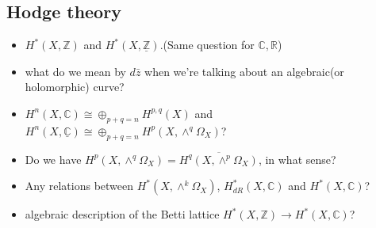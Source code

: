 \documentclass[main.tex]{subfiles}
\begin{document}
\subsection{Hodge theory}
\begin{remark}
\begin{itemize}
We want to clarify the following concepts
\item $H^{*}(X,\mathbb{Z})$ and $H^{*}(X, \underline{\mathbb{Z}})$.(Same question for $\mathbb{C}, \mathbb{R}$)
\item what do we mean by $d\bar{z}$ when we're talking about an algebraic(or holomorphic) curve?
\item $H^{n}(X,\mathbb{C})\cong \oplus_{p+q=n} H^{p,q}(X)$ and $H^{n}(X,\underline{\mathbb{C}})\cong \oplus_{p+q=n} H^{p}(X, \wedge^{q}\Omega_{X})$? 
\item Do we have $H^{p}(X, \wedge^{q}\Omega_{X})=\overline{H^{q}(X, \wedge^{p}\Omega_{X})}$, in what sense?
\item Any relations between $H^{*}(X, \wedge^{k}\Omega_{X})$, $H_{dR}^{*}(X, \mathbb{C})$ and $H^{*}(X,\mathbb{C})$?
\item algebraic description of the Betti lattice $H^{*}(X,\mathbb{Z})\rightarrow H^{*}(X,\mathbb{C})$?
\end{itemize}
\end{remark}
\end{document}
